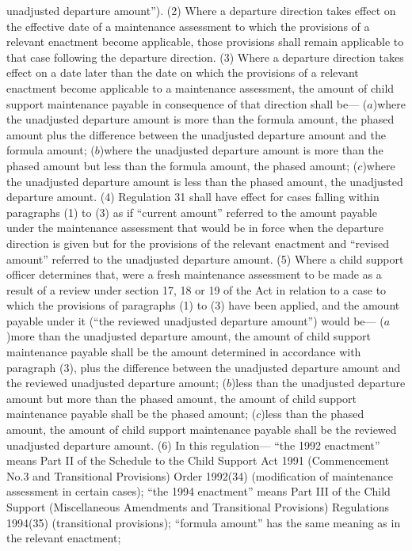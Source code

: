 \documentclass[a4paper]{article}
\begin{document}
unadjusted departure amount”).
(2) Where a departure direction takes effect on the effective date of a
maintenance assessment to which the provisions of a relevant enactment become
applicable, those provisions shall remain applicable to that case following the
departure direction.
(3) Where a departure direction takes effect on a date later than the date on
which the provisions of a relevant enactment become applicable to a maintenance
assessment, the amount of child support maintenance payable in consequence of
that direction shall be—
($a$)where the unadjusted departure amount is more than the formula amount, the
phased amount plus the difference between the unadjusted departure amount and
the formula amount;
($b$)where the unadjusted departure amount is more than the phased amount but less
than the formula amount, the phased amount;
($c$)where the unadjusted departure amount is less than the phased amount, the
unadjusted departure amount.
(4) Regulation 31 shall have effect for cases falling within paragraphs (1) to
(3) as if “current amount” referred to the amount payable under the maintenance
assessment that would be in force when the departure direction is given but for
the provisions of the relevant enactment and “revised amount” referred to the
unadjusted departure amount.
(5) Where a child support officer determines that, were a fresh maintenance
assessment to be made as a result of a review under section 17, 18 or 19 of the
Act in relation to a case to which the provisions of paragraphs (1) to (3) have
been applied, and the amount payable under it (“the reviewed unadjusted
departure amount”) would be—
($a$)more than the unadjusted departure amount, the amount of child support
maintenance payable shall be the amount determined in accordance with paragraph
(3), plus the difference between the unadjusted departure amount and the
reviewed unadjusted departure amount;
($b$)less than the unadjusted departure amount but more than the phased amount,
the amount of child support maintenance payable shall be the phased amount;
($c$)less than the phased amount, the amount of child support maintenance payable
shall be the reviewed unadjusted departure amount.
(6) In this regulation—
“the 1992 enactment” means Part II of the Schedule to the Child Support Act 1991
(Commencement No.3 and Transitional Provisions) Order 1992(34) (modification of
maintenance assessment in certain cases);
“the 1994 enactment” means Part III of the Child Support (Miscellaneous
Amendments and Transitional Provisions) Regulations 1994(35) (transitional
provisions);
“formula amount” has the same meaning as in the relevant enactment;
\end{document}

